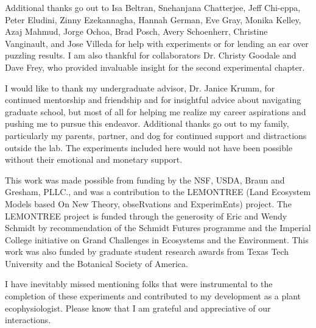 \documentclass{ttuthes2007}
\begin{document}
Additional thanks go out to Isa Beltran, Snehanjana Chatterjee, Jeff Chi-eppa, Peter Eludini, Zinny Ezekannagha, Hannah German, Eve Gray, Monika Kelley, Azaj Mahmud, Jorge Ochoa, Brad Posch, Avery Schoenherr, Christine Vanginault, and Jose Villeda for help with experiments or for lending an ear over puzzling results. I am also thankful for collaborators Dr. Christy Goodale and Dave Frey, who provided invaluable insight for the second experimental chapter.

I would like to thank my undergraduate advisor, Dr. Janice Krumm, for continued mentorship and friendship and for insightful advice about navigating graduate school, but most of all for helping me realize my career aspirations and pushing me to pursue this endeavor. Additional thanks go out to my family, particularly my parents, partner, and dog for continued support and distractions outside the lab. The experiments included here would not have been possible without their emotional and monetary support.

This work was made possible from funding by the NSF, USDA, Braun and Gresham, PLLC., and was a contribution to the LEMONTREE (Land Ecosystem Models based On New Theory, obseRvations and ExperimEnts) project. The LEMONTREE project is funded through the generosity of Eric and Wendy Schmidt by recommendation of the Schmidt Futures programme and the Imperial College initiative on Grand Challenges in Ecosystems and the Environment. This work was also funded by graduate student research awards from Texas Tech University and the Botanical Society of America.

I have inevitably missed mentioning folks that were instrumental to the completion of these experiments and contributed to my development as a plant ecophysiologist. Please know that I am grateful and appreciative of our interactions.

\newpage
\begin{singlespace}
\tableofcontents
\end{singlespace}

\end{document}
